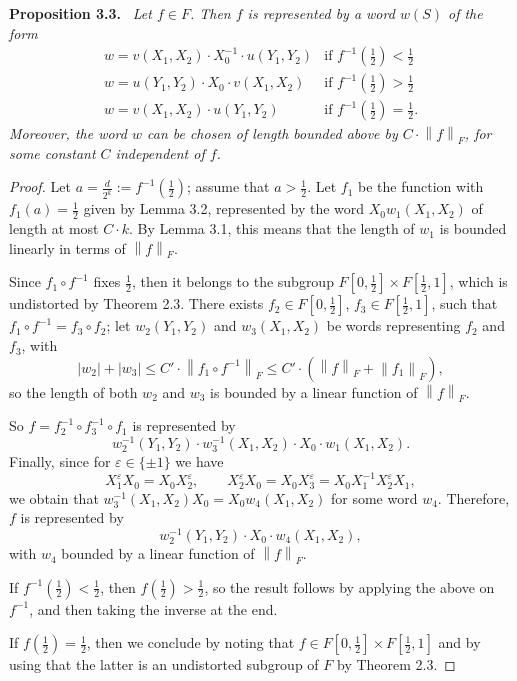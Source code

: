 \documentclass[10pt,a4paper]{article}
\newcommand{\norm}[1]{\left\lVert#1\right\rVert}
\newenvironment{authorstatement}[1]{\par\medskip\noindent\textbf{#1}\ \itshape}{\par\medskip}
\begin{document}
\begin{authorstatement}{Proposition 3.3.}
Let $f\in F$. Then $f$ is represented by a word $w(S)$ of the form
\[
\begin{array}{ll}
w=v(X_1,X_2)\cdot X_0^{-1}\cdot u(Y_1,Y_2)&\text{if }f^{-1}(\frac12)<\frac12\\
w=u(Y_1,Y_2)\cdot X_0\cdot v(X_1,X_2)&\text{if }f^{-1}(\frac12)>\frac12\\
w=v(X_1,X_2)\cdot u(Y_1,Y_2)&\text{if }f^{-1}(\frac12)=\frac12.
\end{array}
\]
Moreover, the word $w$ can be chosen of length bounded above by $C\cdot\norm{f}_F$, for some constant $C$ independent of $f$.
\end{authorstatement}
\begin{proof}
Let $a=\frac d{2^k}:=f^{-1}(\frac12)$; assume that $a>\frac12$. Let $f_1$ be the function with $f_1(a)=\frac12$ given by Lemma 3.2, represented by the word $X_0w_1(X_1,X_2)$ of length at most $C\cdot k$. By Lemma 3.1, this means that the length of $w_1$ is bounded linearly in terms of $\norm{f}_F$.

Since $f_1\circ f^{-1}$ fixes $\frac12$, then it belongs to the subgroup $F[0,\frac12]\times F[\frac12,1]$, which is undistorted by Theorem 2.3. There exists $f_2\in F[0,\frac12]$, $f_3\in F[\frac12,1]$, such that $f_1\circ f^{-1}=f_3\circ f_2$; let $w_2(Y_1,Y_2)$ and $w_3(X_1,X_2)$ be words representing $f_2$ and $f_3$, with
\[
|w_2|+|w_3|\le C'\cdot\norm{f_1\circ f^{-1}}_F\le C'\cdot(\norm{f}_F+\norm{f_1}_F),
\]
so the length of both $w_2$ and $w_3$ is bounded by a linear function of $\norm{f}_F$.

So $f=f_2^{-1}\circ f_3^{-1}\circ f_1$ is represented by
\[
w_2^{-1}(Y_1,Y_2)\cdot w_3^{-1}(X_1,X_2)\cdot X_0\cdot w_1(X_1,X_2).
\]
Finally, since for $\varepsilon\in\{\pm1\}$ we have
\[
X_1^\varepsilon X_0=X_0X_2^\varepsilon,\qquad X_2^\varepsilon X_0=X_0X_3^\varepsilon=X_0X_1^{-1}X_2^\varepsilon X_1,
\]
we obtain that $w_3^{-1}(X_1,X_2)X_0=X_0w_4(X_1,X_2)$ for some word $w_4$. Therefore, $f$ is represented by
\[
w_2^{-1}(Y_1,Y_2)\cdot X_0\cdot w_4(X_1,X_2),
\]
with $w_4$ bounded by a linear function of $\norm{f}_F$.

If $f^{-1}(\frac12)<\frac12$, then $f(\frac12)>\frac12$, so the result follows by applying the above on $f^{-1}$, and then taking the inverse at the end.

If $f(\frac12)=\frac12$, then we conclude by noting that $f\in F[0,\frac12]\times F[\frac12,1]$ and by using that the latter is an undistorted subgroup of $F$ by Theorem 2.3.
\end{proof}
\end{document}
